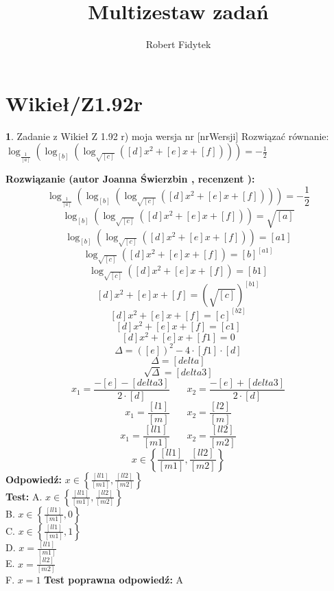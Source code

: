 \documentclass[12pt, a4paper]{article}
\title{Multizestaw zadań}
\author{Robert Fidytek}
\date{}
\theoremstyle{definition} %
\newtheorem{zad}{}
\newcommand{\kategoria}[1]{\section{#1}} %
\newcommand{\zadStart}[1]{\begin{zad}#1\newline} %
\newcommand{\zadStop}{\end{zad}}   %
\newcommand{\rozwStart}[2]{\noindent \textbf{Rozwiązanie (autor #1 , recenzent #2): }\newline} %
\newcommand{\rozwStop}{\newline}                                            %
\newcommand{\odpStart}{\noindent \textbf{Odpowiedź:}\newline}    %
\newcommand{\odpStop}{\newline}                                             %
\newcommand{\testStart}{\noindent \textbf{Test:}\newline} %
\newcommand{\testStop}{\newline} %
\newcommand{\kluczStart}{\noindent \textbf{Test poprawna odpowiedź:}\newline} %
\newcommand{\kluczStop}{\newline} %
\begin{document}
\maketitle


\kategoria{Wikieł/Z1.92r}
\zadStart{Zadanie z Wikieł Z 1.92 r) moja wersja nr [nrWersji]}
Rozwiązać równanie: 
$ \log_{\frac{1}{[a]}}\left(\log_{[b]} \left( \log_{\sqrt{[c]}} \left([d]x^2+[e]x+[f] \right) \right) \right)=-\frac{1}{2}$
\zadStop
\rozwStart{Joanna Świerzbin}{}
$$ \log_{\frac{1}{[a]}}\left(\log_{[b]} \left( \log_{\sqrt{[c]}} \left([d]x^2+[e]x+[f] \right) \right) \right)=-\frac{1}{2}$$
$$ \log_{[b]} \left( \log_{\sqrt{[c]}} \left([d]x^2+[e]x+[f] \right) \right)=\sqrt{[a]}$$ 
$$ \log_{[b]} \left( \log_{\sqrt{[c]}} \left([d]x^2+[e]x+[f] \right) \right)=[a1]$$
$$ \log_{\sqrt{[c]}} \left([d]x^2+[e]x+[f] \right)=[b]^{[a1]}$$ 
$$ \log_{\sqrt{[c]}} \left([d]x^2+[e]x+[f] \right)=[b1]$$ 
$$ [d]x^2+[e]x+[f] =\left(\sqrt{[c]}\right)^{[b1]}$$ 
$$ [d]x^2+[e]x+[f] =[c]^{[b2]}$$ 
$$ [d]x^2+[e]x+[f] =[c1]$$
$$ [d]x^2+[e]x+[f1]=0$$
$$\Delta = ([e])^2-4\cdot[f1]\cdot[d]$$
$$\Delta = [delta] $$ 
$$\sqrt{\Delta} = [delta3] $$ 
$$x_1=\frac{-[e]-[delta3]}{2\cdot[d]} \ \ \ \ \ \ \ \ x_2=\frac{-[e]+[delta3]}{2\cdot[d]}$$
$$x_1=\frac{[l1]}{[m]} \ \ \ \ \ \ \ \ x_2=\frac{[l2]}{[m]}$$
$$x_1=\frac{[ll1]}{[m1]} \ \ \ \ \ \ \ \ x_2=\frac{[ll2]}{[m2]}$$
$$x \in \left\{ \frac{[ll1]}{[m1]},\frac{[ll2]}{[m2]}\right\}$$
\rozwStop
\odpStart
$x \in \left\{ \frac{[ll1]}{[m1]},\frac{[ll2]}{[m2]}\right\}$\\
\odpStop
\testStart
A. $x \in \left\{ \frac{[ll1]}{[m1]},\frac{[ll2]}{[m2]}\right\}$\\
B. $x \in \left\{ \frac{[ll1]}{[m1]},0\right\}$\\
C. $x \in \left\{ \frac{[ll1]}{[m1]},1\right\}$\\
D. $x = \frac{[ll1]}{[m1]}$\\
E. $x =\frac{[ll2]}{[m2]}$\\
F. $x =1$
\testStop
\kluczStart
A
\kluczStop
\end{document}
